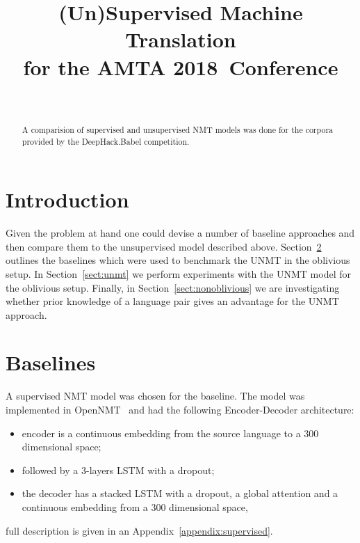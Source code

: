\documentclass[]{article}
\newcommand{\confname}{AMTA 2018}
\begin{document}
\title{\bf (Un)Supervised Machine Translation \\
  for the \confname~Conference}
\author{ \hfill  {}\\
\AND
         \hfill {}
}

\maketitle
\pagestyle{empty}

\begin{abstract}
  A comparision of supervised and unsupervised NMT models was done for the corpora provided by the DeepHack.Babel competition.
\end{abstract}

\section{Introduction}


Given the problem at hand one could devise a number of baseline approaches and then compare them to the unsupervised model described above.
Section~\ref{sect:baselines} outlines the baselines which were used to benchmark the UNMT in the oblivious setup.
In Section~\ref{sect:unmt} we perform experiments with the UNMT model for the oblivious setup.
Finally, in Section~\ref{sect:nonoblivious} we are investigating whether prior knowledge of a language pair gives an advantage for the UNMT approach.

\section{Baselines}
\label{sect:baselines}

A supervised NMT model was chosen for the baseline.
The model was implemented in OpenNMT~\citep{opennmt} and had the following Encoder-Decoder architecture:
\begin{itemize}
\item encoder is a continuous embedding from the source language to a $300$ dimensional space;
\item followed by a $3$-layers LSTM with a dropout;
\item the decoder has a stacked LSTM with a dropout, a global attention \citep{luong2015effective} and a continuous embedding from a $300$ dimensional space,
\end{itemize}
full description is given in an Appendix~\ref{appendix:supervised}.
\end{document}
